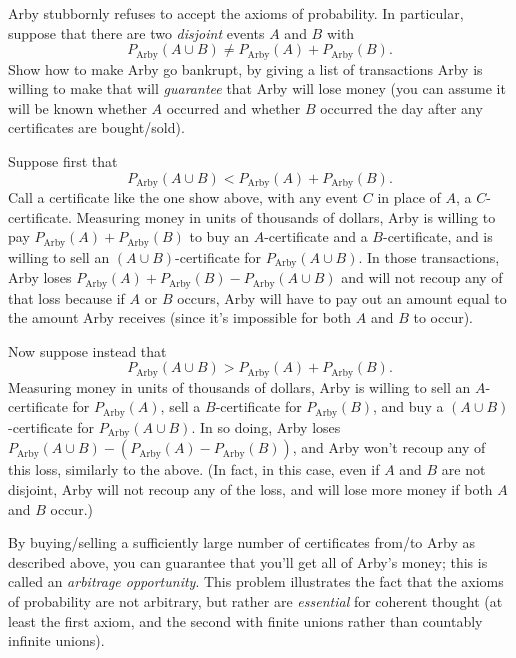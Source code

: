 {    Arby stubbornly refuses to accept the axioms of probability. 
    In particular, suppose that there are two \textit{disjoint} events $A$ and $B$ with 
    \begin{equation*}
        P_{\text{Arby}}(A \cup B) \neq P_{\text{Arby}}(A) + P_{\text{Arby}}(B). 
    \end{equation*}
    Show how to make Arby go bankrupt, by giving a list of transactions Arby is willing to make that will \textit{guarantee} that Arby will lose money (you can assume it will be known whether $A$ occurred and whether $B$ occurred the day after any certificates are bought/sold). 
    \begin{Solution}
        Suppose first that
        \begin{equation*}
            P_{\text{Arby}}(A \cup B) < P_{\text{Arby}}(A) + P_{\text{Arby}}(B). 
        \end{equation*}
        Call a certificate like the one show above, with any event $C$ in place of $A$, a $C$-certificate. 
        Measuring money in units of thousands of dollars, Arby is willing to pay 
        $P_{\text{Arby}}(A) + P_{\text{Arby}}(B)$ to buy an $A$-certificate and a $B$-certificate, and is willing to sell an $(A \cup B)$-certificate for $P_{\text{Arby}}(A \cup B)$. 
        In those transactions, Arby loses $P_{\text{Arby}}(A) + P_{\text{Arby}}(B) - P_{\text{Arby}}(A \cup B)$ and will not recoup any of that loss because if $A$ or $B$ occurs, Arby will have to pay out an amount equal to the amount Arby receives (since it's impossible for both $A$ and $B$ to occur).

        Now suppose instead that 
        \begin{equation*}
            P_{\text{Arby}}(A \cup B) > P_{\text{Arby}}(A) + P_{\text{Arby}}(B). 
        \end{equation*}
        Measuring money in units of thousands of dollars, Arby is willing to sell an $A$-certificate for $P_{\text{Arby}}(A)$, sell a $B$-certificate for $P_{\text{Arby}}(B)$, and buy a $(A \cup B)$-certificate for $P_{\text{Arby}}(A \cup B)$. 
        In so doing, Arby loses $P_{\text{Arby}}(A \cup B) - (P_{\text{Arby}}(A) - P_{\text{Arby}}(B))$, and Arby won't recoup any of this loss, similarly to the above. 
        (In fact, in this case, even if $A$ and $B$ are not disjoint, Arby will not recoup any of the loss, and will lose more money if both $A$ and $B$ occur.) 

        By buying/selling a sufficiently large number of certificates from/to Arby as described above, you can guarantee that you'll get all of Arby's money; this is called an \textit{arbitrage opportunity}. 
        This problem illustrates the fact that the axioms of probability are not arbitrary, but rather are \textit{essential} for coherent thought (at least the first axiom, and the second with finite unions rather than countably infinite unions). 


\end{Solution}}
